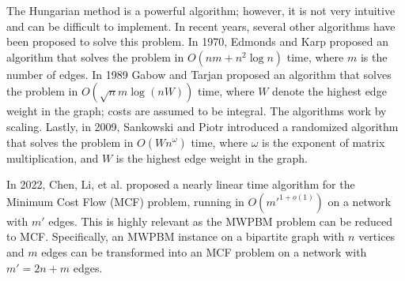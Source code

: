 The Hungarian method is a powerful algorithm; however, it is not very intuitive and can be difficult to implement. In recent years, several other algorithms have been proposed to solve this problem. In 1970, Edmonds and Karp \cite{edmonds1972theoretical} proposed an algorithm that solves the problem in $O(nm + n^2 \log n)$ time, where $m$ is the number of edges. In 1989 Gabow and Tarjan \cite{gabow1989faster} proposed an algorithm that solves the problem in $O(\sqrt{n}m \log(nW))$ time, where $W$ denote the highest edge weight in the graph; costs are assumed to be integral. The algorithms work by scaling. Lastly, in 2009, Sankowski and Piotr \cite{sankowski2009maximum} introduced a randomized algorithm that solves the problem in $O(Wn^\omega)$ time, where $\omega$ is the exponent of matrix multiplication, and $W$ is the highest edge weight in the graph.

In 2022, Chen, Li, et al. \cite{chen2022maximum} proposed a nearly linear time algorithm for the Minimum Cost Flow (MCF) problem, running in $O(m'^{1+o(1)})$ on a network with $m'$ edges. This is highly relevant as the MWPBM problem can be reduced to MCF. Specifically, an MWPBM instance on a bipartite graph with $n$ vertices and $m$ edges can be transformed into an MCF problem on a network with $m' = 2n + m$ edges.


